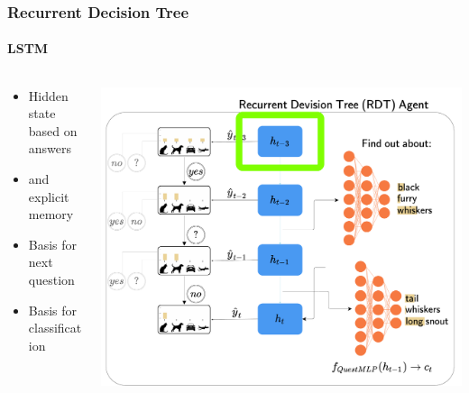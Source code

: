 \documentclass[9pt]{beamer}
\begin{document}
\begin{frame}
\frametitle{Recurrent Decision Tree}
\framesubtitle{LSTM}
\begin{columns}[T]
\begin{column}{.5\textwidth}
\begin{itemize}
	\item Hidden state based on answers
	\item and explicit memory
	\item Basis for next question
	\item Basis for classification
\end{itemize}
\end{column}
\begin{column}{.5\textwidth}
\includegraphics[width=\textwidth]{images/urdtc_parts_lstm.pdf}
\end{column}
\end{columns}
\end{frame}
\end{document}
